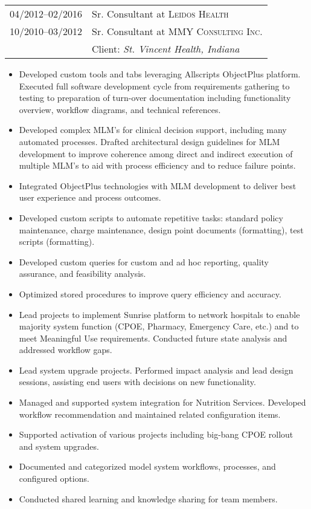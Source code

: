 \documentclass[letter,11pt,DIV=20]{scrartcl}
\begin{document}
\begin{tabu}{r|X}
 \textsc{04/2012--02/2016} & Sr. Consultant at \textsc{Leidos Health} \\\textsc{10/2010--03/2012} & Sr. Consultant at \textsc{MMY Consulting Inc.} 
 \\&Client: \emph{St. Vincent Health, Indiana}
\end{tabu}
{\small
\begin{itemize}[topsep=0pt,nosep,noitemsep]
     \item Developed custom tools and tabs leveraging Allscripts ObjectPlus platform. Executed full software development cycle from requirements gathering to testing to preparation of turn-over documentation including functionality overview, workflow diagrams, and technical references.
     \item Developed complex MLM's for clinical decision support, including many automated processes. Drafted architectural design guidelines for MLM development to improve coherence among direct and indirect execution of multiple MLM's to aid with process efficiency and to reduce failure points.
     \item Integrated ObjectPlus technologies with MLM development to deliver best user experience and process outcomes.
     \item Developed custom scripts to automate repetitive tasks: standard policy maintenance, charge maintenance, design point documents (formatting), test scripts (formatting).
     \item Developed custom queries for custom and ad hoc reporting, quality assurance, and feasibility analysis.
     \item Optimized stored procedures to improve query efficiency and accuracy.
     \item Lead projects to implement Sunrise platform to network hospitals to enable majority system function (CPOE, Pharmacy, Emergency Care, etc.) and to meet Meaningful Use requirements. Conducted future state analysis and addressed workflow gaps.
     \item Lead system upgrade projects. Performed impact analysis and lead design sessions, assisting end users with decisions on new functionality.
     \item Managed and supported system integration for Nutrition Services. Developed workflow recommendation and maintained related configuration items.
     \item Supported activation of various projects including big-bang CPOE rollout and system upgrades.
     \item Documented and categorized model system workflows, processes, and configured options.
     \item Conducted shared learning and knowledge sharing for team members.
 \end{itemize}
 }
 
\end{document}
